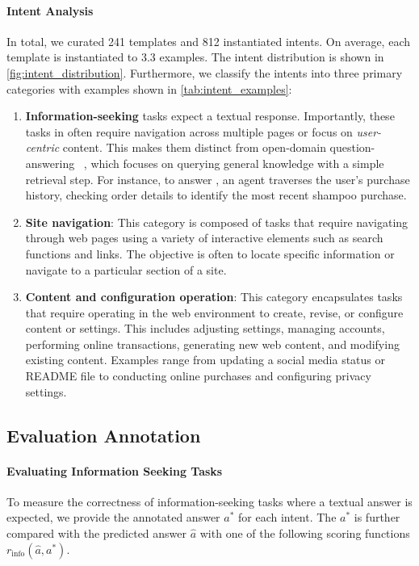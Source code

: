 \documentclass{article}
\begin{document}
\paragraph{Intent Analysis} In total, we curated 241 templates and 812 instantiated intents.
On average, each template is instantiated to 3.3 examples. 
The intent distribution is shown in \autoref{fig:intent_distribution}. 
Furthermore, we classify the intents into three primary categories with examples shown in \autoref{tab:intent_examples}:
\begin{enumerate}[label=(\arabic*),leftmargin=20pt,noitemsep]
    \item \textbf{Information-seeking} tasks expect a textual response. Importantly, these tasks in \ours often require navigation across multiple pages or focus on \emph{user-centric} content. This makes them distinct from open-domain question-answering ~\citep{yang2018hotpotqa,kwiatkowski2019natural}, which focuses on querying general knowledge with a simple retrieval step. For instance, to answer , an agent traverses the user's purchase history, checking order details to identify the most recent shampoo purchase.
    \item \textbf{Site navigation}: This category is composed of tasks that require navigating through web pages using a variety of interactive elements such as search functions and links. The objective is often to locate specific information or navigate to a particular section of a site.
    \item \textbf{Content and configuration operation}: This category encapsulates tasks that require operating in the web environment to create, revise, or configure content or settings. This includes adjusting settings, managing accounts, performing online transactions, generating new web content, and modifying existing content. Examples range from updating a social media status or README file to conducting online purchases and configuring privacy settings.
\end{enumerate}

\subsection{Evaluation Annotation}\label{sec:eval_annotation}
\paragraph{Evaluating Information Seeking Tasks} To measure the correctness of information-seeking tasks where a textual answer is expected, we provide the annotated answer $a^*$ for each intent. 
The $a^*$ is further compared with the predicted answer $\hat{a}$ with one of the following scoring functions $r_{\textrm{info}}(\hat{a}, a^*)$.
\end{document}
